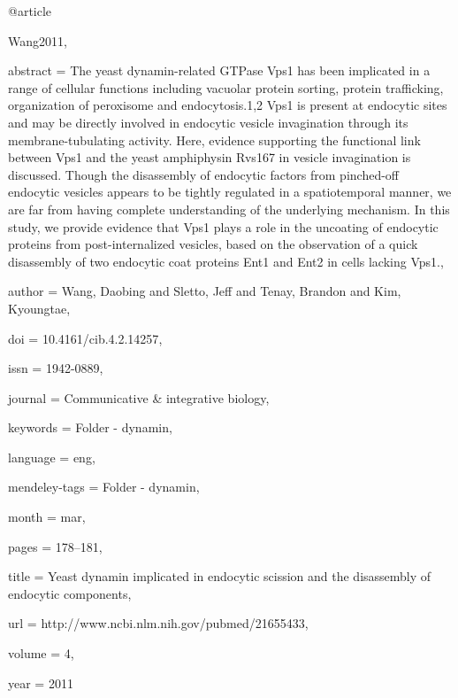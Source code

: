 @article{Wang2011,

abstract = {The yeast dynamin-related GTPase Vps1 has been implicated in a range of cellular functions including vacuolar protein sorting, protein trafficking, organization of peroxisome and endocytosis.1,2 Vps1 is present at endocytic sites and may be directly involved in endocytic vesicle invagination through its membrane-tubulating activity. Here, evidence supporting the functional link between Vps1 and the yeast amphiphysin Rvs167 in vesicle invagination is discussed. Though the disassembly of endocytic factors from pinched-off endocytic vesicles appears to be tightly regulated in a spatiotemporal manner, we are far from having complete understanding of the underlying mechanism. In this study, we provide evidence that Vps1 plays a role in the uncoating of endocytic proteins from post-internalized vesicles, based on the observation of a quick disassembly of two endocytic coat proteins Ent1 and Ent2 in cells lacking Vps1.},

author = {Wang, Daobing and Sletto, Jeff and Tenay, Brandon and Kim, Kyoungtae},

doi = {10.4161/cib.4.2.14257},

issn = {1942-0889},

journal = {Communicative {\&} integrative biology},

keywords = {Folder - dynamin},

language = {eng},

mendeley-tags = {Folder - dynamin},

month = {mar},

pages = {178--181},

title = {{Yeast dynamin implicated in endocytic scission and the disassembly of endocytic components}},

url = {http://www.ncbi.nlm.nih.gov/pubmed/21655433},

volume = {4},

year = {2011}

}

